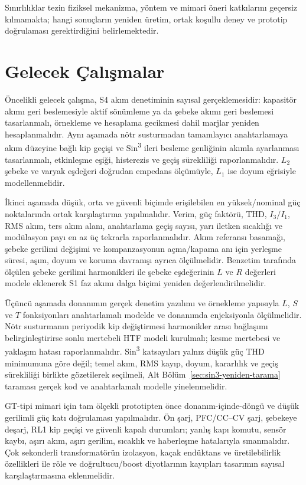 Sınırlılıklar tezin fiziksel mekanizma, yöntem ve mimari öneri katkılarını geçersiz kılmamakta; hangi sonuçların yeniden üretim, ortak koşullu deney ve prototip doğrulaması gerektirdiğini belirlemektedir.

\section{Gelecek Çalışmalar}

Öncelikli gelecek çalışma, S4 akım denetiminin sayısal gerçeklemesidir: kapasitör akımı geri beslemesiyle aktif sönümleme ya da şebeke akımı geri beslemesi tasarlanmalı, örnekleme ve hesaplama gecikmesi dahil marjlar yeniden hesaplanmalıdır. Aynı aşamada nötr susturmadan tamamlayıcı anahtarlamaya akım düzeyine bağlı kip geçişi ve Sin\textsuperscript{3} ileri besleme genliğinin akımla ayarlanması tasarlanmalı, etkinleşme eşiği, histerezis ve geçiş sürekliliği raporlanmalıdır. $L_2$ şebeke ve varyak eşdeğeri doğrudan empedans ölçümüyle, $L_1$ ise doyum eğrisiyle modellenmelidir.

İkinci aşamada düşük, orta ve güvenli biçimde erişilebilen en yüksek/nominal güç noktalarında ortak karşılaştırma yapılmalıdır. Verim, güç faktörü, THD, $I_3/I_1$, RMS akım, ters akım alanı, anahtarlama geçiş sayısı, yarı iletken sıcaklığı ve modülasyon payı en az üç tekrarla raporlanmalıdır. Akım referansı basamağı, şebeke gerilimi değişimi ve kompanzasyonun açma/kapama anı için yerleşme süresi, aşım, doyum ve koruma davranışı ayrıca ölçülmelidir. Benzetim tarafında ölçülen şebeke gerilimi harmonikleri ile şebeke eşdeğerinin $L$ ve $R$ değerleri modele eklenerek S1 faz akımı dalga biçimi yeniden değerlendirilmelidir.

Üçüncü aşamada donanımın gerçek denetim yazılımı ve örnekleme yapısıyla $L$, $S$ ve $T$ fonksiyonları anahtarlamalı modelde ve donanımda enjeksiyonla ölçülmelidir. Nötr susturmanın periyodik kip değiştirmesi harmonikler arası bağlaşımı belirginleştirirse sonlu mertebeli HTF modeli kurulmalı; kesme mertebesi ve yaklaşım hatası raporlanmalıdır. Sin\textsuperscript{3} katsayıları yalnız düşük güç THD minimumuna göre değil; temel akım, RMS kayıp, doyum, kararlılık ve geçiş sürekliliği birlikte gözetilerek seçilmeli, Alt Bölüm~\ref{sec:sin3-yeniden-tarama} taraması gerçek kod ve anahtarlamalı modelle yinelenmelidir.

GT-tipi mimari için tam ölçekli prototipten önce donanım-içinde-döngü ve düşük gerilimli güç katı doğrulaması yapılmalıdır. Ön şarj, PFC/CC--CV şarj, şebekeye deşarj, RL1 kip geçişi ve güvenli kapalı durumları; yanlış kapı komutu, sensör kaybı, aşırı akım, aşırı gerilim, sıcaklık ve haberleşme hatalarıyla sınanmalıdır. Çok sekonderli transformatörün izolasyon, kaçak endüktans ve üretilebilirlik özellikleri ile röle ve doğrultucu/boost diyotlarının kayıpları tasarımın sayısal karşılaştırmasına eklenmelidir.

